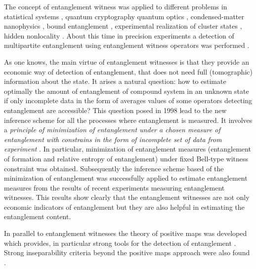 \documentclass[twocolumn,aps,rmp]{revtex4}
\begin{document}
The concept of entanglement witness was applied to different problems in statistical
systems \cite {Cavalcanti05,WiesniakVB-Magnetic,LidarWBS,BruknerVZ2006}, quantum
cryptography \cite {CurtyGLL} quantum optics \cite
{StobinskaW-teor-s,stobinska-2006-20}, condensed-matter nanophysics
\cite {BlaauboerD}, bound entanglement \cite {HyllusABM}, experimental realization of cluster states
\cite {VallonePMMB2007}, hidden nonlocality \cite {MasanesLD2007}. About this
time in precision experiments a detection of multipartite entanglement
using entanglement witness operators was performed \cite
{Bourennane,Roos,Knill,Blatt,BarbieriMNMAM,Zeilinger-witness,Mikami-witness,Altepeter,LuZGGZSGYP2007}.

As one knows, the main virtue of entanglement witnesses is that they
provide an economic way of detection of entanglement, that does not
need full (tomographic) information about the state. It arises a
natural question: how to estimate optimally the amount of entanglement
of compound system in an unknown state if only incomplete data in the
form of averages values of some operators detecting entanglement are
accessible? This question posed in 1998 lead to the new inference
scheme for all the processes where entanglement is measured. It
involves a {\it principle of minimization of entanglement under a
  chosen measure of entanglement with constrains in the form of
  incomplete set of data from experiment} \cite {Jaynes}. In
particular, minimization of entanglement measures (entanglement of
formation and relative entropy of entanglement) under fixed Bell-type
witness constraint was obtained. Subsequently  the inference scheme based
of the minimization of entanglement was successfully applied \cite
{Reimpell,EisertBA,PlenioA} to estimate entanglement measures from the
results of recent experiments measuring entanglement witnesses. This
results show clearly that the entanglement witnesses are not only
economic indicators of entanglement but they are also helpful in
estimating the entanglement content.

In parallel to entanglement witnesses the theory of positive maps was
developed which provides, in particular strong tools for the detection
of entanglement \cite
{Terhal2000-laa,Kossakowski,BenattiFPquan_dyn,MPiani,PianiM,ChruscinskiK,Hall2006,Breuer2006-prl,CavesDFS,reduction,CerfAG,Majewski}.
Strong inseparability criteria beyond the positive maps approach were
also found
\cite{Rudolph,HHH02-permut,MintertKB2004-multi,OGuehne,HofmannT,ChenWu,ClarisseW2005-permut,GuhneHGE2007,DeviPR2007}.
\end{document}
